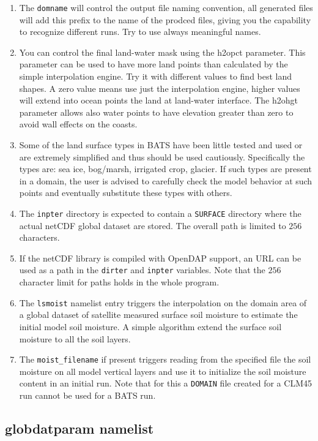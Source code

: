 \begin{enumerate}
\item The \verb=domname= will control the output file naming convention, all
generated files will add this prefix to the name of the prodced files,
giving you the capability to recognize different runs. Try to use always
meaningful names.
\item You can control the final land-water mask using the h2opct parameter.
This parameter can be used to have more land points than calculated by
the simple interpolation engine. Try it with different values to find best
land shapes. A zero value means use just the interpolation engine, higher
values will extend into ocean points the land at land-water interface.
The h2ohgt parameter allows also water points to have elevation greater
than zero to avoid wall effects on the coasts.
\item Some of the land surface types in BATS have been little tested and used
or are extremely simplified and thus should be used cautiously. Specifically
the types are: sea ice, bog/marsh, irrigated crop, glacier. If such types are
present in a domain, the user is advised to carefully check the model behavior
at such points and eventually substitute these types with others.
\item The \verb=inpter= directory is expected to contain a \verb=SURFACE=
directory where the actual netCDF global dataset are stored. The overall
path is limited to $256$ characters.
\label{pathnote}
\item If the netCDF library is compiled with OpenDAP support, an URL
can be used as a path in the \verb=dirter= and \verb=inpter= variables.
Note that the $256$ character limit for paths holds in the whole program.
\item The \verb=lsmoist= namelist entry triggers the interpolation on the
domain area of a global dataset of satellite measured surface soil moisture
to estimate the initial model soil moisture. A simple algorithm extend the
surface soil moisture to all the soil layers.
\item The \verb=moist_filename= if present triggers reading from the
specified file the soil moisture on all model vertical layers and use it to
initialize the soil moisture content in an initial run. Note that for this
a \verb=DOMAIN= file created for a CLM45 run cannot be used for a BATS run.
\end{enumerate}

\subsection{globdatparam namelist}
\label{globparam}

